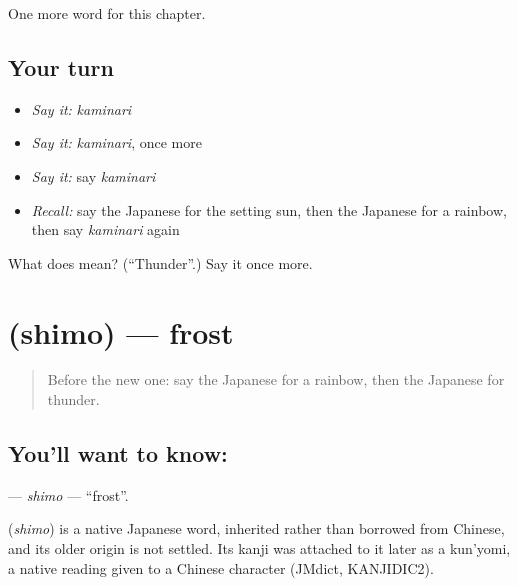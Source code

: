 \begin{grammarlens}[title={What you've built}]
One more word for this chapter.
\end{grammarlens}

\subsection*{Your turn}
\begin{itemize}
\raggedright
  \item \emph{Say it:} \emph{kaminari}
  \item \emph{Say it:} \emph{kaminari}, once more
  \item \emph{Say it:} say \emph{kaminari}
  \item \emph{Recall:} say the Japanese for the setting sun, then the Japanese for a rainbow, then say \emph{kaminari} again
\end{itemize}

\begin{tcolorbox}[breakable,colback=teal!4,colframe=teal!35!black,title={Before you move on}]
What does  mean? (\textquotedblleft{}Thunder\textquotedblright{}.) Say it once more.
\end{tcolorbox}
\section[\texorpdfstring{\ja{しも} (shimo)}{しも (shimo)}]{ (shimo) — frost}

\label{lesson:JA-C69-shimo}



\begin{quote}
Before the new one: say the Japanese for a rainbow, then the Japanese for thunder.
\end{quote}

\subsection*{You'll want to know: }
\textbf{} — \emph{shimo} — \textquotedblleft{}frost\textquotedblright{}.

\begin{cousinweb}
\textbf{} (\emph{shimo}) is a native Japanese word, inherited rather than borrowed from Chinese, and its older origin is not settled. Its kanji was attached to it later as a kun'yomi, a native reading given to a Chinese character (JMdict, KANJIDIC2).
\end{cousinweb}


